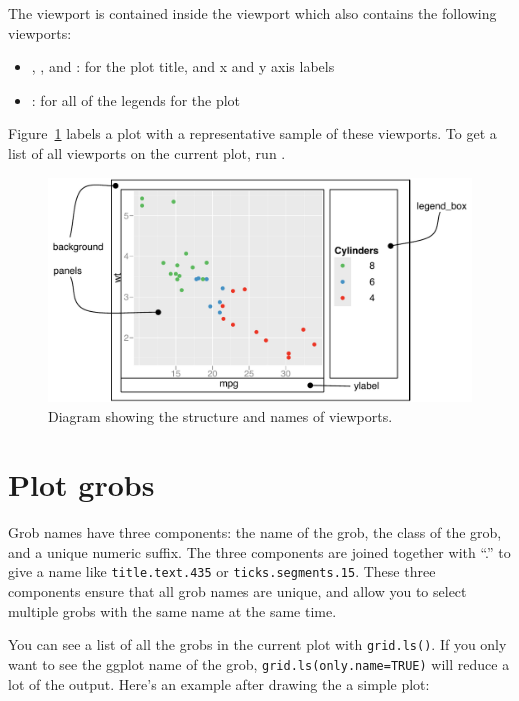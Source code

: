 The  viewport is contained inside the  viewport which also contains the following viewports:

\begin{itemize}
  \item {}, , and : for the plot title, and x and y axis labels
  \item {}: for all of the legends for the plot
\end{itemize}

\noindent Figure~\ref{fig:viewports} labels a plot with a representative sample of these viewports.  To get a list of all viewports on the current plot, run .

\begin{figure}[htbp]
  \centering
    \includegraphics[width=\textwidth]{grid-viewports}
  \caption{Diagram showing the structure and names of viewports.}
  \label{fig:viewports}
\end{figure}

\section{Plot grobs}
\label{sec:plot-grobs}

Grob names have three components: the name of the grob, the class of the grob, and a unique numeric suffix.  The three components are joined together with ``.'' to give a name like {\tt title.text.435} or {\tt ticks.segments.15}.  These three components ensure that all grob names are unique, and allow you to select multiple grobs with the same name at the same time.

You can see a list of all the grobs in the current plot with {\tt grid.ls()}.  If you only want to see the ggplot name of the grob, {\tt grid.ls(only.name=TRUE)} will reduce a lot of the output.  Here's an example after drawing the a simple plot:

